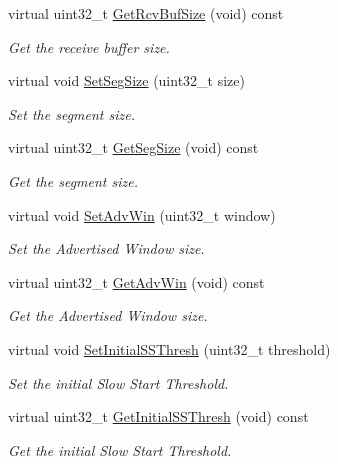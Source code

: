 \begin{DoxyCompactItemize}
virtual uint32\+\_\+t \hyperlink{classns3_1_1NscTcpSocketImpl_a3a6d2b4ac47aefa2af8a966b2aa503e4}{Get\+Rcv\+Buf\+Size} (void) const 
\begin{DoxyCompactList}\small\item\em Get the receive buffer size. \end{DoxyCompactList}\item 
virtual void \hyperlink{classns3_1_1NscTcpSocketImpl_a99bc1f0c16d1b8d89dfa1dfc09ed36fc}{Set\+Seg\+Size} (uint32\+\_\+t size)
\begin{DoxyCompactList}\small\item\em Set the segment size. \end{DoxyCompactList}\item 
virtual uint32\+\_\+t \hyperlink{classns3_1_1NscTcpSocketImpl_addc1afb69283e231c76cb7cd32757028}{Get\+Seg\+Size} (void) const 
\begin{DoxyCompactList}\small\item\em Get the segment size. \end{DoxyCompactList}\item 
virtual void \hyperlink{classns3_1_1NscTcpSocketImpl_adb5fe89fd18d023048286fdef77d90ec}{Set\+Adv\+Win} (uint32\+\_\+t window)
\begin{DoxyCompactList}\small\item\em Set the Advertised Window size. \end{DoxyCompactList}\item 
virtual uint32\+\_\+t \hyperlink{classns3_1_1NscTcpSocketImpl_a0183272f45f2c108c29ac2106ea17bbc}{Get\+Adv\+Win} (void) const 
\begin{DoxyCompactList}\small\item\em Get the Advertised Window size. \end{DoxyCompactList}\item 
virtual void \hyperlink{classns3_1_1NscTcpSocketImpl_acc637bc723828d456466a99e58c3cd53}{Set\+Initial\+S\+S\+Thresh} (uint32\+\_\+t threshold)
\begin{DoxyCompactList}\small\item\em Set the initial Slow Start Threshold. \end{DoxyCompactList}\item 
virtual uint32\+\_\+t \hyperlink{classns3_1_1NscTcpSocketImpl_a3891d4740503569d4a5d6f77bb4d9903}{Get\+Initial\+S\+S\+Thresh} (void) const 
\begin{DoxyCompactList}\small\item\em Get the initial Slow Start Threshold. \end{DoxyCompactList}\item 

\end{DoxyCompactItemize}
